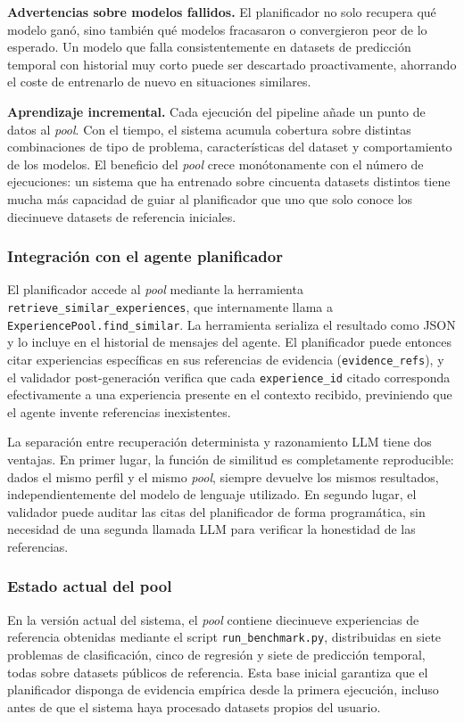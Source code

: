 \textbf{Advertencias sobre modelos fallidos.} El planificador no solo recupera qué modelo ganó, sino también qué modelos fracasaron o convergieron peor de lo esperado. Un modelo que falla consistentemente en datasets de predicción temporal con historial muy corto puede ser descartado proactivamente, ahorrando el coste de entrenarlo de nuevo en situaciones similares.

\textbf{Aprendizaje incremental.} Cada ejecución del pipeline añade un punto de datos al \emph{pool}. Con el tiempo, el sistema acumula cobertura sobre distintas combinaciones de tipo de problema, características del dataset y comportamiento de los modelos. El beneficio del \emph{pool} crece monótonamente con el número de ejecuciones: un sistema que ha entrenado sobre cincuenta datasets distintos tiene mucha más capacidad de guiar al planificador que uno que solo conoce los diecinueve datasets de referencia iniciales.

\subsubsection*{Integración con el agente planificador}
\label{sec:experience-planner-integration}

El planificador accede al \emph{pool} mediante la herramienta \texttt{retrieve\_similar\_experiences}, que internamente llama a \texttt{ExperiencePool.find\_similar}. La herramienta serializa el resultado como JSON y lo incluye en el historial de mensajes del agente. El planificador puede entonces citar experiencias específicas en sus referencias de evidencia (\texttt{evidence\_refs}), y el validador post-generación verifica que cada \texttt{experience\_id} citado corresponda efectivamente a una experiencia presente en el contexto recibido, previniendo que el agente invente referencias inexistentes.

La separación entre recuperación determinista y razonamiento LLM tiene dos ventajas. En primer lugar, la función de similitud es completamente reproducible: dados el mismo perfil y el mismo \emph{pool}, siempre devuelve los mismos resultados, independientemente del modelo de lenguaje utilizado. En segundo lugar, el validador puede auditar las citas del planificador de forma programática, sin necesidad de una segunda llamada LLM para verificar la honestidad de las referencias.

\subsubsection*{Estado actual del pool}
\label{sec:experience-current-state}

En la versión actual del sistema, el \emph{pool} contiene diecinueve experiencias de referencia obtenidas mediante el script \texttt{run\_benchmark.py}, distribuidas en siete problemas de clasificación, cinco de regresión y siete de predicción temporal, todas sobre datasets públicos de referencia. Esta base inicial garantiza que el planificador disponga de evidencia empírica desde la primera ejecución, incluso antes de que el sistema haya procesado datasets propios del usuario.